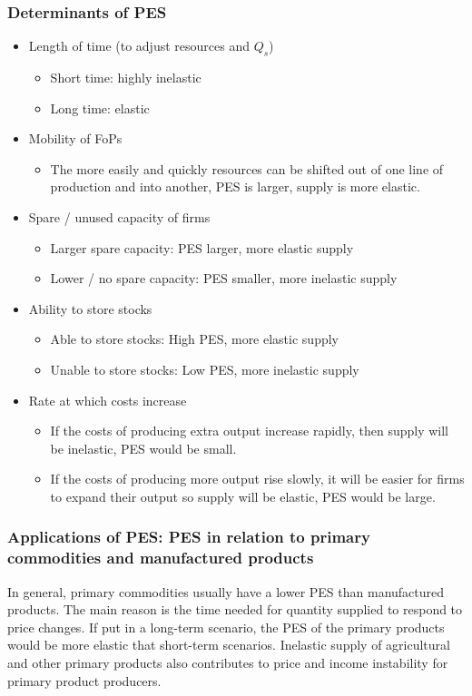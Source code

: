\subsubsection*{Determinants of PES}
\begin{itemize}
  \item Length of time (to adjust resources and $Q_s$)
  \begin{itemize}
    \item Short time: highly inelastic
    \item Long time: elastic
  \end{itemize}
  \item Mobility of FoPs
  \begin{itemize}
    \item The more easily and quickly resources can be shifted out of one line of production and into another, PES is larger, supply is more elastic.
  \end{itemize}
  \item Spare / unused capacity of firms
  \begin{itemize}
    \item Larger spare capacity: PES larger, more elastic supply
    \item Lower / no spare capacity: PES smaller, more inelastic supply
  \end{itemize}
  \item Ability to store stocks
  \begin{itemize}
    \item Able to store stocks: High PES, more elastic supply
    \item Unable to store stocks: Low PES, more inelastic supply
  \end{itemize}
  \item Rate at which costs increase
  \begin{itemize}
    \item If the costs of producing extra output increase rapidly, then supply will be inelastic, PES would be small.
    \item If the costs of producing more output rise slowly, it will be easier for firms to expand their output so supply will be elastic, PES would be large.
  \end{itemize}
\end{itemize}
\subsubsection*{Applications of PES: PES in relation to primary commodities and manufactured products}
In general, primary commodities usually have a lower PES than manufactured products. The main reason
is the time needed for quantity supplied to respond to price changes. If put in a long-term scenario, the PES of the primary products would be more elastic that short-term scenarios. Inelastic supply of agricultural and other primary products also contributes to price and income instability for
primary product producers.
